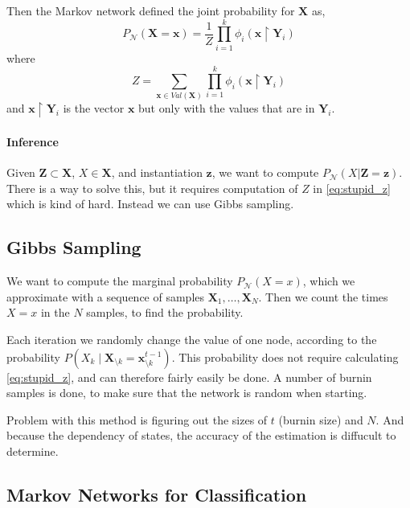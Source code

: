Then the Markov network defined the joint probability for $\mathbf{X}$ as,
\[
    P_\mathcal{N} (\mathbf{X} = \mathbf{x}) = \frac 1 Z \prod_{i=1}^k \phi_i(\mathbf{x} \upharpoonright \mathbf{Y}_i)
\]
where
\begin{equation}
    \label{eq:stupid_z}
    Z = \sum_{\mathbf{x} \in Val(\mathbf{X})} \prod_{i=1}^k \phi_i (\mathbf{x} \upharpoonright \mathbf{Y}_i)
\end{equation}
and $\mathbf{x} \upharpoonright \mathbf{Y}_i$ is the vector $\mathbf{x}$ but only with the values that are in $\mathbf{Y}_i$.

\paragraph{Inference}
Given $\mathbf{Z} \subset \mathbf{X}$, $X \in \mathbf{X}$, and instantiation $\mathbf{z}$, we want to compute $P_\mathcal{N}(X | \mathbf{Z} = \mathbf{z})$.
There is a way to solve this, but it requires computation of $Z$ in \cref{eq:stupid_z} which is kind of hard.
Instead we can use Gibbs sampling.

\subsection{Gibbs Sampling}

We want to compute the marginal probability $P_\mathcal{N}(X = x)$, which we approximate with a sequence of samples $\mathbf{X}_1, \dots, \mathbf{X}_N$.
Then we count the times $X = x$ in the $N$ samples, to find the probability.

Each iteration we randomly change the value of one node, according to the probability $P(X_k \mid \mathbf{X}_{\setminus k}= \mathbf{x}_{\setminus k}^{t-1})$.
This probability does not require calculating \cref{eq:stupid_z}, and can therefore fairly easily be done.
A number of burnin samples is done, to make sure that the network is random when starting.

Problem with this method is figuring out the sizes of $t$ (burnin size) and $N$.
And because the dependency of states, the accuracy of the estimation is diffucult to determine.

\subsection{Markov Networks for Classification}

